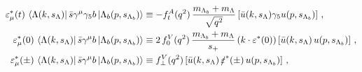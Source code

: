 \begin{equation}
\label{eq:physics:b-baryons:1/2+to1/2+:hel-ff-A}
\begin{aligned}
    \varepsilon_\mu^*(t) \, \bra{\Lambda(k, s_\Lambda)} \bar{s} \gamma^\mu \gamma_5 b \ket{\Lambda_b(p, s_{\Lambda_b})}
    & \equiv -f_t^A(q^2) \, \frac{m_{\Lambda_b} + m_\Lambda}{\sqrt{q^2}}
             \left[ \bar u(k, s_\Lambda) \gamma_5 u(p,s_{\Lambda_b}) \right]\,,\\
    \varepsilon_\mu^*(0) \, \bra{\Lambda(k, s_\Lambda)} \bar{s} \gamma^\mu b \ket{\Lambda_b(p, s_{\Lambda_b})}
    & \equiv 2 \, f^{V}_0(q^2) \, \frac{m_{\Lambda_b} + m_\Lambda}{s_+}
             \, (k \cdot\varepsilon^*(0)) \left[ \bar u(k,s_\Lambda) \, u(p,s_{\Lambda_b}) \right]\,,\\
    \varepsilon_\mu^*(\pm) \, \bra{\Lambda(k, s_\Lambda)} \bar{s} \gamma^\mu b \ket{\Lambda_b(p, s_{\Lambda_b})}
    & \equiv f^{V}_\perp(q^2) \left[ \bar u(k,s_\Lambda) \, \slashed{\varepsilon}^*(\pm) \, u(p,s_{\Lambda_b}) \right]\,,
\end{aligned}
\end{equation}
